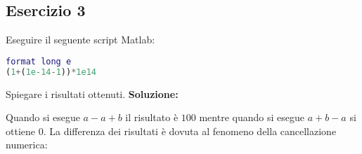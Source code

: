 \subsection{Esercizio 3}
Eseguire il seguente script Matlab:
\begin{lstlisting}[language=Matlab]
format long e
(1+(1e-14-1))*1e14
\end{lstlisting}
Spiegare i risultati ottenuti.
\newline \textbf{Soluzione:}

Quando si esegue $a-a+b$ il risultato è $100$ mentre quando si esegue $a+b-a$ si ottiene $0$. La differenza dei risultati è dovuta al fenomeno della cancellazione
numerica:
